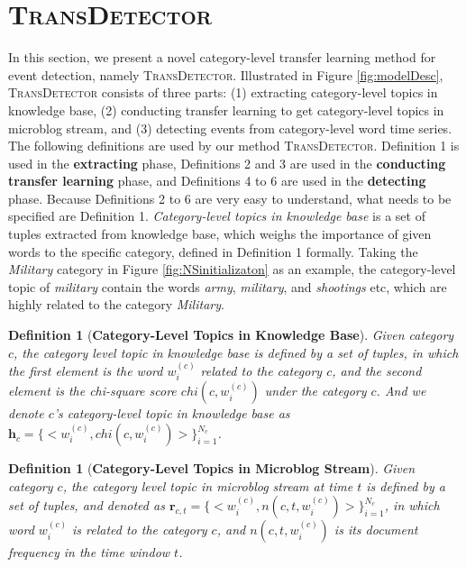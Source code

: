 \documentclass[runningheads,a4paper]{llncs}
\theoremstyle{exampstyle}
\newtheorem{rmkWithoutSpacing}[thm]{Definition}
\begin{document}
\section{\textsc{TransDetector}} 
\label{sec:TransDetector}
In this section, we present a novel category-level transfer learning method for event detection, namely \textsc{TransDetector}. 
Illustrated in Figure \ref{fig:modelDesc}, \textsc{TransDetector} consists of three parts: (1) extracting category-level topics in knowledge base, (2) conducting transfer learning to get category-level topics in microblog stream, and (3) detecting events from category-level word time series.
The following definitions are used by our method \textsc{TransDetector}. 
Definition 1 is used in the \textbf{extracting} phase, Definitions 2 and 3 are used in the \textbf{conducting transfer learning} phase, and Definitions 4 to 6 are used in the \textbf{detecting} phase.
Because Definitions 2 to 6 are very easy to understand, what needs to be specified are Definition 1.
\textit{Category-level topics in knowledge base} is a set of tuples extracted from knowledge base, which weighs the importance of given words to the specific category, defined in Definition 1 formally. 
Taking the \textit{Military} category in Figure \ref{fig:NSinitializaton} as an example, the category-level topic of \textit{military} contain the words \textit{army}, \textit{military}, and \textit{shootings} etc, which are highly related to the category \textit{Military}.

\begin{rmkWithoutSpacing}[\textbf{Category-Level Topics in Knowledge Base}] 
Given category \(c\), the category level topic in knowledge base is defined by a set of tuples, in which the first element is the word \(w^{(c)}_i\) related to the category \(c\), and the second element is the chi-square score \(chi(c,w^{(c)}_{i})\) under the category \(c\). 
And we denote \(c\)'s category-level topic in knowledge base as \(\bm{h}_c=\{<w^{(c)}_i,chi(c,w^{(c)}_{i})>\}_{i=1}^{N_c}\).
\end{rmkWithoutSpacing}

\begin{rmkWithoutSpacing}[\textbf{Category-Level Topics in Microblog Stream}] 
Given category \(c\), the category level topic in microblog stream at time \(t\) is defined by a set of tuples, and denoted as \(\bm{r}_{c,t}=\{<w^{(c)}_i,n(c,t,w^{(c)}_{i})>\}_{i=1}^{N_c}\), in which word \(w^{(c)}_{i}\) is related to the category \(c\), and \(n(c,t,w^{(c)}_{i})\) is its document frequency in the time window \(t\).
\end{rmkWithoutSpacing}
\end{document}
